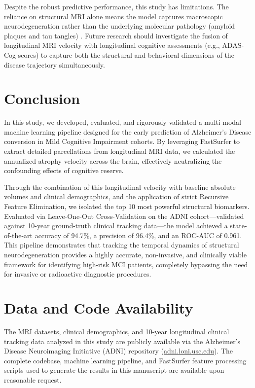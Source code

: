 \documentclass[11pt, a4paper]{article}
\begin{document}
Despite the robust predictive performance, this study has limitations. The reliance on structural MRI alone means the model captures macroscopic neurodegeneration rather than the underlying molecular pathology (amyloid plaques and tau tangles) \cite{jack2010}. Future research should investigate the fusion of longitudinal MRI velocity with longitudinal cognitive assessments (e.g., ADAS-Cog scores) to capture both the structural and behavioral dimensions of the disease trajectory simultaneously.

\section{Conclusion}
In this study, we developed, evaluated, and rigorously validated a multi-modal machine learning pipeline designed for the early prediction of Alzheimer's Disease conversion in Mild Cognitive Impairment cohorts. By leveraging FastSurfer to extract detailed parcellations from longitudinal MRI data, we calculated the annualized atrophy velocity across the brain, effectively neutralizing the confounding effects of cognitive reserve. 

Through the combination of this longitudinal velocity with baseline absolute volumes and clinical demographics, and the application of strict Recursive Feature Elimination, we isolated the top 10 most powerful structural biomarkers. Evaluated via Leave-One-Out Cross-Validation on the ADNI cohort---validated against 10-year ground-truth clinical tracking data---the model achieved a state-of-the-art accuracy of 94.7\%, a precision of 96.4\%, and an ROC-AUC of 0.961. This pipeline demonstrates that tracking the temporal dynamics of structural neurodegeneration provides a highly accurate, non-invasive, and clinically viable framework for identifying high-risk MCI patients, completely bypassing the need for invasive or radioactive diagnostic procedures.

\section*{Data and Code Availability}
The MRI datasets, clinical demographics, and 10-year longitudinal clinical tracking data analyzed in this study are publicly available via the Alzheimer's Disease Neuroimaging Initiative (ADNI) repository (\url{adni.loni.usc.edu}). The complete codebase, machine learning pipeline, and FastSurfer feature processing scripts used to generate the results in this manuscript are available upon reasonable request.
\end{document}
